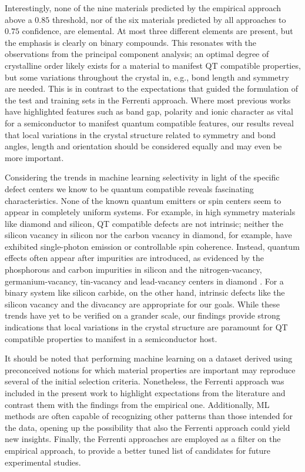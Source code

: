 \documentclass[superscriptaddress,
preprint,
 amsmath,amssymb,
 aps,
]{revtex4-2}
\begin{document}
Interestingly, none of the nine materials predicted by the empirical approach above a $0.85$ threshold, nor of the six materials predicted by all approaches to $0.75$ confidence, are elemental. At most three different elements are present, but the emphasis is clearly on binary compounds. This resonates with the observations from the principal component analysis; an optimal degree of crystalline order likely exists for a material to manifest QT compatible properties, but some variations throughout the crystal in, e.g., bond length and symmetry are needed. This is in contrast to the expectations that guided the formulation of the test and training sets in the Ferrenti approach. Where most previous works have highlighted features such as band gap, polarity and ionic character as vital for a semiconductor to manifest quantum compatible features, our results reveal that local variations in the crystal structure related to symmetry and bond angles, length and orientation should be considered equally and may even be more important. 

Considering the trends in machine learning selectivity in light of the specific defect centers we know to be quantum compatible reveals fascinating characteristics. None of the known quantum emitters or spin centers seem to appear in completely uniform systems. For example, in high symmetry materials like diamond and silicon, QT compatible defects are not intrinsic; neither the silicon vacancy in silicon nor the carbon vacancy in diamond, for example,  have exhibited single-photon emission or controllable spin coherence. Instead, quantum effects often appear after impurities are introduced, as evidenced by the phosphorous and carbon impurities in silicon \cite{He2019,Redjem2020} and the nitrogen-vacancy, germanium-vacancy, tin-vacancy and lead-vacancy centers in diamond \cite{Thiering2020}. 
For a binary system like silicon carbide, on the other hand, intrinsic defects like the silicon vacancy and the divacancy are appropriate for our goals. 
While these trends have yet to be verified on a grander scale, our findings provide strong indications that local variations in the crystal structure are paramount for QT compatible properties to manifest in a semiconductor host. 

It should be noted that performing machine learning on a dataset derived using preconceived notions for which material properties are important may reproduce several of the initial selection criteria. Nonetheless, the Ferrenti approach was included in the present work to highlight expectations from the literature and contrast them with the findings from the empirical one. Additionally, ML methods are often capable of recognizing other patterns than those intended for the data, opening up the possibility that also the Ferrenti approach could yield new insights. Finally, the Ferrenti approaches are employed as a filter on the empirical approach, to provide a better tuned list of candidates for future experimental studies. 
\end{document}
